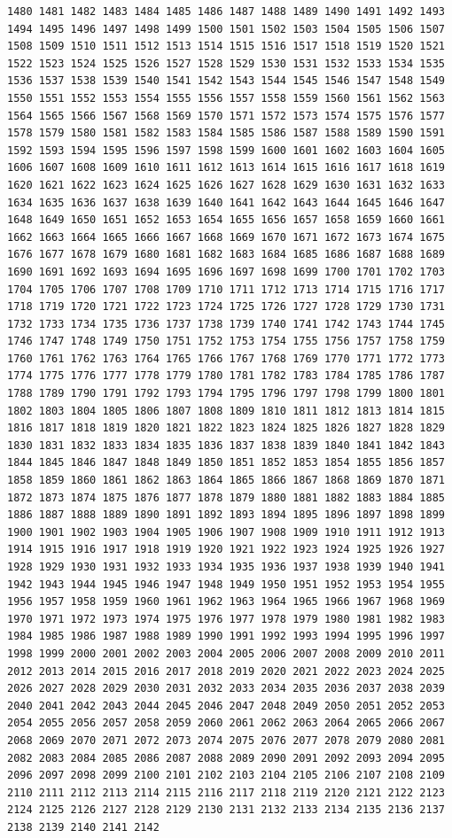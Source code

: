 \documentclass[11pt,]{article}
\begin{document}
\begin{verbatim}
1480 1481 1482 1483 1484 1485 1486 1487 1488 1489 1490 1491 1492 1493 1494 1495 1496 1497 1498 1499 1500 1501 1502 1503 1504 1505 1506 1507 1508 1509 1510 1511 1512 1513 1514 1515 1516 1517 1518 1519 1520 1521 1522 1523 1524 1525 1526 1527 1528 1529 1530 1531 1532 1533 1534 1535 1536 1537 1538 1539 1540 1541 1542 1543 1544 1545 1546 1547 1548 1549 1550 1551 1552 1553 1554 1555 1556 1557 1558 1559 1560 1561 1562 1563 1564 1565 1566 1567 1568 1569 1570 1571 1572 1573 1574 1575 1576 1577 1578 1579 1580 1581 1582 1583 1584 1585 1586 1587 1588 1589 1590 1591 1592 1593 1594 1595 1596 1597 1598 1599 1600 1601 1602 1603 1604 1605 1606 1607 1608 1609 1610 1611 1612 1613 1614 1615 1616 1617 1618 1619 1620 1621 1622 1623 1624 1625 1626 1627 1628 1629 1630 1631 1632 1633 1634 1635 1636 1637 1638 1639 1640 1641 1642 1643 1644 1645 1646 1647 1648 1649 1650 1651 1652 1653 1654 1655 1656 1657 1658 1659 1660 1661 1662 1663 1664 1665 1666 1667 1668 1669 1670 1671 1672 1673 1674 1675 1676 1677 1678 1679 1680 1681 1682 1683 1684 1685 1686 1687 1688 1689 1690 1691 1692 1693 1694 1695 1696 1697 1698 1699 1700 1701 1702 1703 1704 1705 1706 1707 1708 1709 1710 1711 1712 1713 1714 1715 1716 1717 1718 1719 1720 1721 1722 1723 1724 1725 1726 1727 1728 1729 1730 1731 1732 1733 1734 1735 1736 1737 1738 1739 1740 1741 1742 1743 1744 1745 1746 1747 1748 1749 1750 1751 1752 1753 1754 1755 1756 1757 1758 1759 1760 1761 1762 1763 1764 1765 1766 1767 1768 1769 1770 1771 1772 1773 1774 1775 1776 1777 1778 1779 1780 1781 1782 1783 1784 1785 1786 1787 1788 1789 1790 1791 1792 1793 1794 1795 1796 1797 1798 1799 1800 1801 1802 1803 1804 1805 1806 1807 1808 1809 1810 1811 1812 1813 1814 1815 1816 1817 1818 1819 1820 1821 1822 1823 1824 1825 1826 1827 1828 1829 1830 1831 1832 1833 1834 1835 1836 1837 1838 1839 1840 1841 1842 1843 1844 1845 1846 1847 1848 1849 1850 1851 1852 1853 1854 1855 1856 1857 1858 1859 1860 1861 1862 1863 1864 1865 1866 1867 1868 1869 1870 1871 1872 1873 1874 1875 1876 1877 1878 1879 1880 1881 1882 1883 1884 1885 1886 1887 1888 1889 1890 1891 1892 1893 1894 1895 1896 1897 1898 1899 1900 1901 1902 1903 1904 1905 1906 1907 1908 1909 1910 1911 1912 1913 1914 1915 1916 1917 1918 1919 1920 1921 1922 1923 1924 1925 1926 1927 1928 1929 1930 1931 1932 1933 1934 1935 1936 1937 1938 1939 1940 1941 1942 1943 1944 1945 1946 1947 1948 1949 1950 1951 1952 1953 1954 1955 1956 1957 1958 1959 1960 1961 1962 1963 1964 1965 1966 1967 1968 1969 1970 1971 1972 1973 1974 1975 1976 1977 1978 1979 1980 1981 1982 1983 1984 1985 1986 1987 1988 1989 1990 1991 1992 1993 1994 1995 1996 1997 1998 1999 2000 2001 2002 2003 2004 2005 2006 2007 2008 2009 2010 2011 2012 2013 2014 2015 2016 2017 2018 2019 2020 2021 2022 2023 2024 2025 2026 2027 2028 2029 2030 2031 2032 2033 2034 2035 2036 2037 2038 2039 2040 2041 2042 2043 2044 2045 2046 2047 2048 2049 2050 2051 2052 2053 2054 2055 2056 2057 2058 2059 2060 2061 2062 2063 2064 2065 2066 2067 2068 2069 2070 2071 2072 2073 2074 2075 2076 2077 2078 2079 2080 2081 2082 2083 2084 2085 2086 2087 2088 2089 2090 2091 2092 2093 2094 2095 2096 2097 2098 2099 2100 2101 2102 2103 2104 2105 2106 2107 2108 2109 2110 2111 2112 2113 2114 2115 2116 2117 2118 2119 2120 2121 2122 2123 2124 2125 2126 2127 2128 2129 2130 2131 2132 2133 2134 2135 2136 2137 2138 2139 2140 2141 2142 
\end{verbatim}
\end{document}
